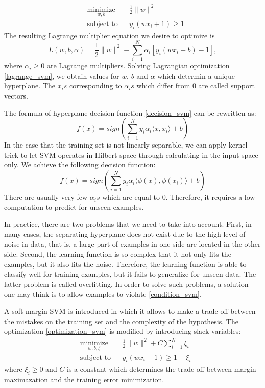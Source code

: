 \begin{equation}
\label{optimization_svm}
\begin{aligned}
& \underset{w,b}{\text{minimize}}
& & \frac{1}{2}\| w \|^2 \\
& \text{subject to}
& & y_i(wx_i + 1) \geq 1
\end{aligned}
\end{equation}
The resulting Lagrange multiplier equation we desire to optimize is
\begin{equation}
\label{lagrange_svm}
L(w,b,\alpha) = \frac{1}{2} \| w \|^2 - \sum_{i=1}^{N}\alpha_{i}\left[ 
y_i(wx_i + b) -1 \right],
\end{equation}
where $\alpha_i \geq 0$ are Lagrange multipliers. Solving Lagrangian optimization \ref{lagrange_svm}, we obtain values for $w$, $b$ and $\alpha$ which determin a unique hyperplane. The $x_is$ corresponding to $\alpha_is$ which differ from 0 are called support vectors.

The formula of hyperplane decision function \ref{decision_svm} can be rewritten as:
\begin{equation}
f(x) = sign(\sum_{i=1}^{N} y_i \alpha_i \langle x,x_i \rangle + b)
\end{equation}
In the case that the training set is not linearly separable, we can apply kernel trick to let SVM operates in Hilbert space through calculating in the input space only. We achieve the following decision function:
\begin{equation}
f(x) = sign(\sum_{i=1}^{N} y_i \alpha_i \langle \phi(x),\phi(x_i) \rangle + b)
\end{equation}
There are usually very few $\alpha_is$ which are equal to 0. Therefore, it requires a low computation to predict for unseen examples.

In practice, there are two problems that we need to take into account. First, in many cases, the separating hyperplane does not exist due to the high level of noise in data, that is, a large part of examples in one side are located in the other side. Second, the learning function is so complex that it not only fits the examples, but it also fits the noise. Therefore, the learning function is able to classify well for training examples, but it fails to generalize for unseen data. The latter problem is called overfitting. In order to solve such problems, a solution one may think is to allow examples to violate \ref{condition_svm}. 

A soft margin SVM is introduced in which it allows to make a trade off between the mistakes on the training set and the complexity of the hypothesis. The optimization \ref{optimization_svm} is modified by introducing slack variables:
\begin{equation}
\label{optimization_softsvm}
\begin{aligned}
& \underset{w,b,\xi}{\text{minimize}}
& & \frac{1}{2}\| w \|^2 + C\sum_{i=1}^N \xi_i \\
& \text{subject to}
& & y_i(wx_i + 1) \geq 1 - \xi_i
\end{aligned}
\end{equation}
where $\xi_i \geq 0$ and $C$ is a constant which determines the trade-off between margin maximazation and the training error minimization.

